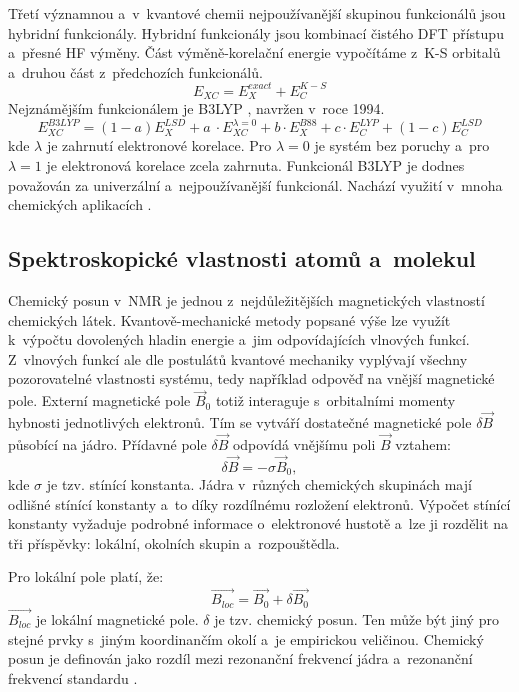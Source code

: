 \documentclass[
digital, %
table,   %
nolof,     %
nolot,     %
oneside,
]{fithesis3}
\begin{document}
Třetí významnou a~v~kvantové chemii nejpoužívanější skupinou funkcionálů jsou hybridní funkcionály. Hybridní funkcionály jsou kombinací čistého DFT přístupu a~přesné HF výměny. Část výměně-korelační energie vypočítáme z~K-S orbitalů a~druhou část z~předchozích funkcionálů.
\begin{equation}
E_{XC} = E_{X}^{exact} + E_C^{K-S}
\end{equation}
Nejznámějším funkcionálem je B3LYP \cite{b3lyp}, navržen v~roce 1994.
\begin{equation}
E_{XC}^{B3LYP} = (1-a)E_{X}^{LSD} + a~\cdot E_{XC}^{\lambda = 0} + b \cdot E_{X}^{B88} + c \cdot E_{C}^{LYP} + (1-c)E_{C}^{LSD}
\end{equation}
kde $\lambda$ je zahrnutí elektronové korelace. Pro $\lambda=0$ je systém bez poruchy a~pro $\lambda=1$ je elektronová korelace zcela zahrnuta. Funkcionál B3LYP je dodnes považován za univerzální a~nejpoužívanější funkcionál. Nachází využití v~mnoha chemických aplikacích \cite{koch2000chemist}.

\subsection{Spektroskopické vlastnosti atomů a~molekul}
Chemický posun v~NMR je jednou z~nejdůležitějších magnetických vlastností chemických látek. Kvantově-mechanické metody popsané výše lze využít k~výpočtu dovolených hladin energie a~jim odpovídajících vlnových funkcí. Z~vlnových funkcí ale dle postulátů kvantové mechaniky vyplývají všechny pozorovatelné vlastnosti systému, tedy například odpověď na vnější magnetické pole. Externí magnetické pole $\vec{B}_0$ totiž interaguje s~orbitalními momenty hybnosti jednotlivých elektronů. Tím se vytváří dostatečné magnetické pole $\delta \vec{B}$ působící na jádro. Přídavné pole $\delta \vec{B}$ odpovídá vnějšímu poli $\vec{B}$ vztahem:
\begin{equation}
\delta \vec{B} = - \sigma \vec{B}_0,
\end{equation}
kde $\sigma$ je tzv. stínící konstanta. Jádra v~různých chemických skupinách mají odlišné stínící konstanty  a~to díky rozdílnému rozložení elektronů. Výpočet stínící konstanty vyžaduje podrobné informace o~elektronové hustotě a~lze ji rozdělit na tři příspěvky: lokální, okolních skupin a~rozpouštědla.

Pro lokální pole platí, že:
\begin{equation}
\vec{B_{loc}} = \vec{B_0} + \delta \vec{B_0}
\end{equation}
$\vec{B_{loc}}$ je lokální magnetické pole. $\delta$ je tzv. chemický posun. Ten může být jiný pro stejné prvky s~jiným koordinančím okolí a~je empirickou veličinou. Chemický posun je definován jako rozdíl mezi rezonanční frekvencí jádra a~rezonanční frekvencí standardu \cite{atkins2010atkins}.
\end{document}
